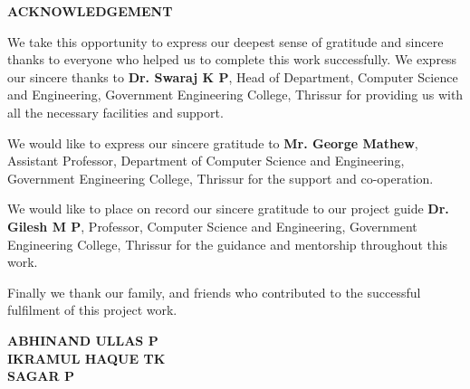 \begin{center}
{\LARGE \textbf{ACKNOWLEDGEMENT}}
\end{center}

\vspace{1cm}

We take this opportunity to express our deepest sense of gratitude and sincere thanks to everyone who helped us to complete this work successfully. We express our sincere thanks to \textbf{Dr. Swaraj K P}, Head of Department, Computer Science and Engineering, Government Engineering College, Thrissur for providing us with all the necessary facilities and support.

We would like to express our sincere gratitude to \textbf{Mr. George Mathew}, Assistant Professor, Department of Computer Science and Engineering, Government Engineering College, Thrissur for the support and co-operation.

We would like to place on record our sincere gratitude to our project guide \newline
\textbf{Dr. Gilesh M P}, Professor, Computer Science and Engineering, Government Engineering College, Thrissur for the guidance and mentorship throughout this work.

Finally we thank our family, and friends who contributed to the successful fulfilment of this project work.

\vspace{1.5cm}

\begin{flushright}
\textbf{ABHINAND ULLAS P}\\
\textbf{IKRAMUL HAQUE TK}\\
\textbf{SAGAR P}
\end{flushright}
